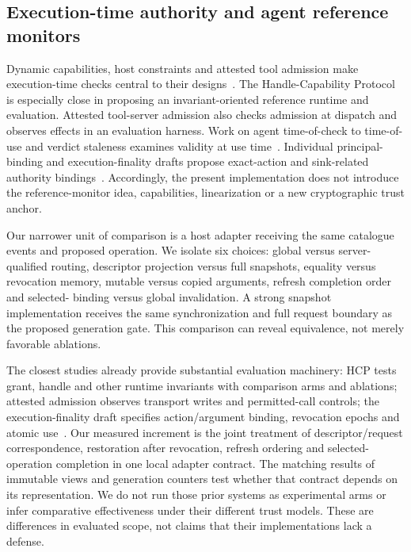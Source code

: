 \subsection{Execution-time authority and agent reference monitors}
Dynamic capabilities, host constraints and attested tool admission make
execution-time checks central to their designs~\cite{dynamiccapabilities,hcp,attested}.
The Handle-Capability Protocol is especially close in proposing an invariant-oriented
reference runtime and evaluation. Attested tool-server admission also checks
admission at dispatch and observes effects in an evaluation harness. Work on
agent time-of-check to time-of-use and verdict staleness examines validity at use
time~\cite{mindgap,approvedtoolate}. Individual principal-binding and execution-finality
drafts propose exact-action and sink-related authority bindings~\cite{principalbinding,executionfinality}.
Accordingly, the present implementation does not introduce the reference-monitor
idea, capabilities, linearization or a new cryptographic trust anchor.

Our narrower unit of comparison is a host adapter receiving the same catalogue
events and proposed operation. We isolate six choices: global versus server-qualified
routing, descriptor projection versus full snapshots, equality versus revocation
memory, mutable versus copied arguments, refresh completion order and selected-
binding versus global invalidation. A strong snapshot implementation receives the
same synchronization and full request boundary as the proposed generation gate.
This comparison can reveal equivalence, not merely favorable ablations.

The closest studies already provide substantial evaluation machinery: HCP tests
grant, handle and other runtime invariants with comparison arms and ablations;
attested admission observes transport writes and permitted-call controls; the
execution-finality draft specifies action/argument binding, revocation epochs and
atomic use~\cite{hcp,attested,executionfinality}. Our measured increment is the
joint treatment of descriptor/request correspondence, restoration after revocation,
refresh ordering and selected-operation completion in one local adapter contract.
The matching results of immutable views and generation counters test whether that
contract depends on its representation. We do not run those prior systems as
experimental arms or infer comparative effectiveness under their different trust
models. These are differences in evaluated scope, not claims that their
implementations lack a defense.

